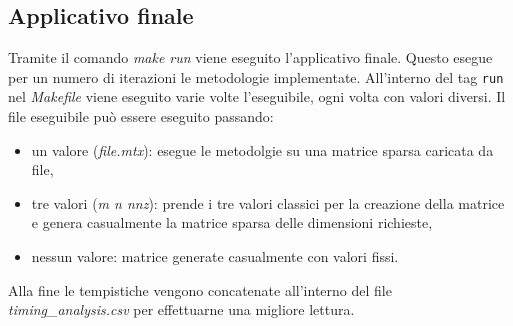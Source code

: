 	
	\subsection{Applicativo finale}
	\label{applicativo-finale}
	Tramite il comando \textit{make run} viene eseguito l'applicativo finale. Questo esegue per un numero di iterazioni le metodologie implementate. All'interno del tag \texttt{run} nel \textit{Makefile} viene eseguito varie volte l'eseguibile, ogni volta con valori diversi.\newline
	Il file eseguibile può essere eseguito passando:
	\begin{itemize}
		\item un valore (\textit{file.mtx}): esegue le metodolgie su una matrice sparsa caricata da file,
		\item tre valori (\textit{m n nnz}): prende i tre valori classici per la creazione della matrice e genera casualmente la matrice sparsa delle dimensioni richieste,
		\item nessun valore: matrice generate casualmente con valori fissi.
	\end{itemize}
	Alla fine le tempistiche vengono concatenate all'interno del file \textit{timing\_analysis.csv} per effettuarne una migliore lettura.